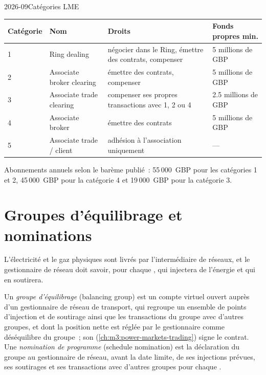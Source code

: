 \begin{dated}{2026-09}{Catégories LME}\label{dat:m3:getting-access-commodities-and-power:lme}
\begin{center}
\footnotesize
\begin{tabular}{@{}lp{3.2cm}p{4.3cm}l@{}}
\toprule
Catégorie & Nom & Droits & Fonds propres min. \\
\midrule
1 & Ring dealing & négocier dans le Ring, émettre des contrats, compenser & 5 millions de GBP \\
2 & Associate broker clearing & émettre des contrats, compenser & 5 millions de GBP \\
3 & Associate trade clearing & compenser ses propres transactions avec 1, 2 ou 4 & 2.5 millions de GBP \\
4 & Associate broker & émettre des contrats & 5 millions de GBP \\
5 & Associate trade / client & adhésion à l'association uniquement & --- \\
\bottomrule
\end{tabular}
\end{center}
Abonnements annuels selon le barème publié~: 55\,000~GBP pour les catégories 1 et 2, 45\,000~GBP pour la
catégorie 4 et 19\,000~GBP pour la catégorie 3.
\end{dated}

\section{Groupes d'équilibrage et nominations}

L'électricité et le gaz physiques sont livrés par l'intermédiaire de réseaux, et le gestionnaire de réseau doit savoir, pour chaque
, qui injectera de l'énergie et qui en soutirera.

\begin{definition}\label{def:m3:getting-access-commodities-and-power:group}
Un \emph{groupe d'équilibrage} (balancing group) est un compte virtuel ouvert auprès d'un gestionnaire de réseau de transport,
qui regroupe un ensemble de points d'injection et de soutirage ainsi que les transactions du groupe avec d'autres groupes, et dont
la position nette est réglée par le gestionnaire comme déséquilibre du groupe~; son 
(\cref{ch:m3:power-markets-trading}) signe le contrat. Une
\emph{nomination de programme} (schedule nomination) est la déclaration du groupe au gestionnaire de réseau, avant la date limite, de ses injections prévues,
ses soutirages et ses transactions avec d'autres groupes pour chaque .
\end{definition}

